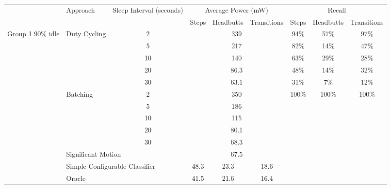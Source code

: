 
\begin{table*}
\centering
{\small
    \begin{tabular}{|l|l|c|c|c|c|c|c|c|}
    \hline
	\multirow{2}{*}{~}			& \multirow{2}{*}{Approach}		& \multirow{2}{*}{\parbox{1.9cm}{Sleep Interval (seconds)}}	
																						& \multicolumn{3}{c|}{Average Power (mW)}		& \multicolumn{3}{c|}{Recall} 													\\ \cline{4-9}
								&								&						& Steps		& Headbutts	& Transitions	& Steps					& Headbutts					& Transitions 				\\ \hline
	\multirow{14}{*}{\parbox{1.2cm}{Group 1 90\% idle}}	
								& \multirow{5}{*}{Duty Cycling}	& 2						& \multicolumn{3}{c|}{339}				& 94\%					& 57\%						& 97\%						\\ \cline{3-9}
								& 								& 5						& \multicolumn{3}{c|}{217}				& 82\%					& 14\%						& 47\%						\\ \cline{3-9}
								& 								& 10					& \multicolumn{3}{c|}{140}				& 63\%					& 29\%						& 28\%						\\ \cline{3-9}
								& 								& 20					& \multicolumn{3}{c|}{86.3}				& 48\%					& 14\%						& 32\%						\\ \cline{3-9}
								& 								& 30					& \multicolumn{3}{c|}{63.1}				& 31\%					& 7\%						& 12\%						\\ \cline{2-9}
								
								& \multirow{5}{*}{Batching}		& 2						& \multicolumn{3}{c|}{350}				& \multirow{8}{*}{100\%}& \multirow{8}{*}{100\%}	& \multirow{8}{*}{100\%}	\\ \cline{3-6}
								& 								& 5						& \multicolumn{3}{c|}{186}				&						&							&							\\ \cline{3-6}
								& 								& 10					& \multicolumn{3}{c|}{115}				&						&							&							\\ \cline{3-6}
								& 								& 20					& \multicolumn{3}{c|}{80.1}				&						&							&							\\ \cline{3-6}
								& 								& 30					& \multicolumn{3}{c|}{68.3}				&						&							&							\\ \cline{2-6}
								
								& \multicolumn{2}{l|}{Significant Motion}				& \multicolumn{3}{c|}{67.5}				& 						& 							& 							\\ \cline{2-6}
								& \multicolumn{2}{l|}{Simple Configurable Classifier}	& 48.3		& 23.3		& 18.6			& 						& 							& 							\\ \cline{2-6}
								& \multicolumn{2}{l|}{Oracle}							& 41.5		& 21.6		& 16.4			& 						& 							& 							\\ \hline \hline
								

\end{tabular}}
\end{table*}
